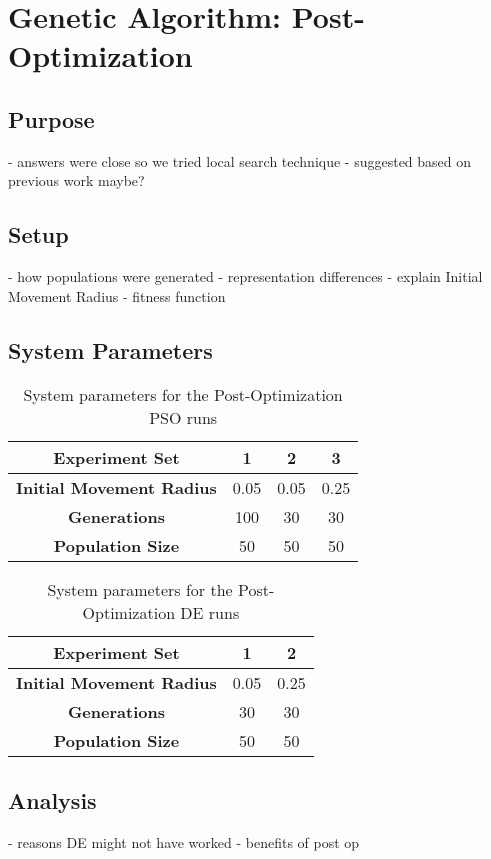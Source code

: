 \section{Genetic Algorithm: Post-Optimization}

\subsection{Purpose}

- answers were close so we tried local search technique
- suggested based on previous work maybe?

\subsection{Setup}

- how populations were generated
- representation differences
- explain Initial Movement Radius
- fitness function

\subsection{System Parameters}

\begin{table}
	\label{table:post-op-pso}
	\centering
	\begin{tabular}{ | >{\bfseries}c | c | c | c | }
		\hline
		Experiment Set & 1 & 2 & 3 \\ \hline
		Initial Movement Radius & 0.05 & 0.05 & 0.25 \\ \hline
		Generations & 100 & 30 & 30 \\ \hline
		Population Size & 50 & 50 & 50 \\ \hline
	\end{tabular}
	\caption{System parameters for the Post-Optimization PSO runs}
\end{table}

\begin{table}
	\label{table:post-op-de}
	\centering
	\begin{tabular}{ | >{\bfseries}c | c | c | }
		\hline
		Experiment Set & 1 & 2 \\ \hline
		Initial Movement Radius & 0.05 & 0.25 \\ \hline
		Generations & 30 & 30 \\ \hline
		Population Size & 50 & 50 \\ \hline
	\end{tabular}
	\caption{System parameters for the Post-Optimization DE runs}
\end{table}

\subsection{Analysis}

- reasons DE might not have worked
- benefits of post op